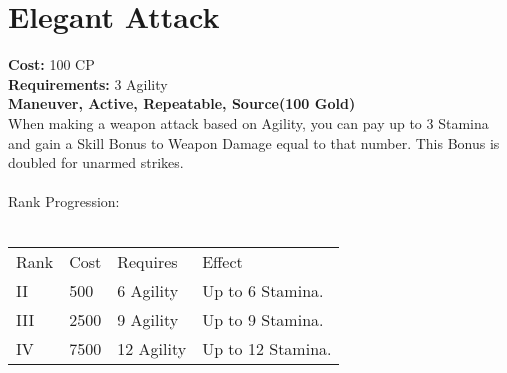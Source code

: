 \section{Elegant Attack}\label{maneuver:elegantAttack}
\textbf{Cost:} 100 CP\\
\textbf{Requirements:} 3 Agility\\
\textbf{Maneuver, Active, Repeatable, Source(100 Gold)}\\
When making a weapon attack based on Agility, you can pay up to 3 Stamina and gain a Skill Bonus to Weapon Damage equal to that number.
This Bonus is doubled for unarmed strikes.\\
\\
Rank Progression:\\
\\
\begin{tabular}{l | l | l | l}
	Rank & Cost & Requires & Effect\\
	II & 500 & 6 Agility & Up to 6 Stamina.\\
	III & 2500 & 9 Agility & Up to 9 Stamina.\\
	IV & 7500 & 12 Agility & Up to 12 Stamina.\\
\end{tabular}